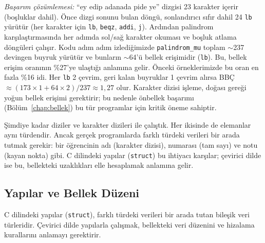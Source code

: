 \begin{ornek}[4.11]
\emph{Başarım çözümlemesi:} ``ey edip adanada pide ye'' dizgisi 23 karakter içerir (boşluklar dahil). Önce dizgi sonunu bulan döngü, sonlandırıcı sıfır dahil 24 \texttt{lb} yürütür (her karakter için \texttt{lb}, \texttt{beqz}, \texttt{addi}, \texttt{j}). Ardından palindrom karşılaştırmasında her adımda sol/sağ karakter okuması ve boşluk atlama döngüleri çalışır. Kodu adım adım izlediğimizde \texttt{palindrom\_mu} toplam $\sim$237 devingen buyruk yürütür ve bunların $\sim$64'ü bellek erişimidir (\texttt{lb}). Bu, bellek erişim oranının \%27'ye ulaştığı anlamına gelir. Önceki örneklerimizde bu oran en fazla \%16 idi. Her \texttt{lb} 2 çevrim, geri kalan buyruklar 1 çevrim alırsa BBÇ~$\approx (173 \times 1 + 64 \times 2) / 237 \approx 1{,}27$ olur. Karakter dizisi işleme, doğası gereği yoğun bellek erişimi gerektirir; bu nedenle önbellek başarımı (Bölüm~\ref{chap:bellek}) bu tür programlar için kritik öneme sahiptir.
\end{ornek}


Şimdiye kadar diziler ve karakter dizileri ile çalıştık. Her ikisinde de elemanlar aynı türdendir. Ancak gerçek programlarda farklı türdeki verileri bir arada tutmak gerekir: bir öğrencinin adı (karakter dizisi), numarası (tam sayı) ve notu (kayan nokta) gibi. C dilindeki yapılar (\texttt{struct}) bu ihtiyacı karşılar; çevirici dilde ise bu, bellekteki uzaklıkları elle hesaplamak anlamına gelir.

\subsection{Yapılar ve Bellek Düzeni}
\label{subsec:yapilar}

C dilindeki yapılar (\texttt{struct}), farklı türdeki verileri bir arada tutan bileşik veri türleridir. Çevirici dilde yapılarla çalışmak, bellekteki veri düzenini ve hizalama kurallarını anlamayı gerektirir.


